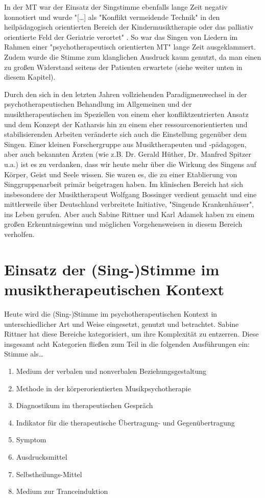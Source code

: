In der MT war der Einsatz der Singstimme ebenfalls lange Zeit negativ konnotiert und wurde "[\ldots] als "Konflikt vermeidende Technik" in den heilpädagogisch orientierten Bereich der Kindermusiktherapie oder das palliativ orientierte Feld der Geriatrie verortet" \autocite[10]{wolf2012}. So war das Singen von Liedern im Rahmen einer "psychotherapeutisch orientierten MT" lange Zeit ausgeklammert. Zudem wurde die Stimme zum klanglichen Ausdruck kaum genutzt, da man einen zu großen Widerstand seitens der Patienten erwartete (siehe weiter unten in diesem Kapitel). 

Durch den sich in den letzten Jahren vollziehenden Paradigmenwechsel in der psychotherapeutischen Behandlung im Allgemeinen und der musiktherapeutischen im Speziellen von einem eher konfliktzentrierten Ansatz und dem Konzept der Katharsis hin zu einem eher ressourcenorientierten und stabilisierenden Arbeiten veränderte sich auch die Einstellung gegenüber dem Singen\autocite[vgl.][11]{wolf2012}. Einer kleinen Forschergruppe aus Musiktherapeuten und -pädagogen, aber auch bekannten Ärzten (wie z.B. Dr. Gerald Hüther, Dr. Manfred Spitzer u.a.) ist es zu verdanken, dass wir heute mehr über die Wirkung des Singens auf Körper, Geist und Seele wissen. Sie waren es, die zu einer Etablierung von Singgruppenarbeit primär beigetragen haben. Im klinischen Bereich hat sich insbesondere der Musiktherapeut Wolfgang Bossinger verdient gemacht und eine mittlerweile über Deutschland verbreitete Initiative, "Singende Krankenhäuser", ins Leben gerufen. Aber auch Sabine Rittner und Karl Adamek haben zu einem großen Erkenntnisgewinn und möglichen Vorgehensweisen in diesem Bereich verholfen.

\section{Einsatz der (Sing-)Stimme im musiktherapeutischen Kontext}

Heute wird die (Sing-)Stimme im psychotherapeutischen Kontext in unterschiedlicher Art und Weise eingesetzt, genutzt und betrachtet. Sabine Rittner \autocite[vgl.][204 ff.]{rittner2008} hat diese Bereiche kategorisiert, um ihre Komplexität zu entzerren. Diese insgesamt acht Kategorien fließen zum Teil in die folgenden Ausführungen ein: 
Stimme als\ldots
\begin{enumerate}
\item Medium der verbalen und nonverbalen Beziehungsgestaltung
\item Methode in der körperorientierten Musikpsychotherapie
\item Diagnostikum im therapeutischen Gespräch
\item Indikator für die therapeutische Übertragung- und Gegenübertragung
\item Symptom
\item Ausdrucksmittel
\item Selbstheilungs-Mittel
\item Medium zur Tranceinduktion
\end{enumerate}

